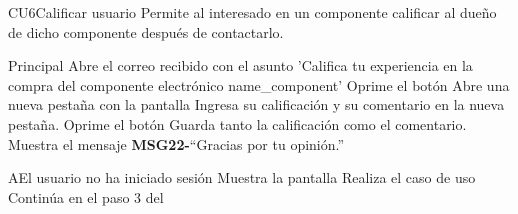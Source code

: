 
	\begin{UseCase}{CU6}{Calificar usuario}{
		Permite al interesado en un componente calificar al dueño de dicho componente después de contactarlo.
	}
	\end{UseCase}

	\begin{UCtrayectoria}{Principal}
		\UCpaso[\UCactor] Abre el correo recibido con el asunto 'Califica tu experiencia en la compra del componente electrónico name\_component'
		\UCpaso[\UCactor] Oprime el botón  
		\UCpaso Abre una nueva pestaña con la pantalla  
		\UCpaso[\UCactor] Ingresa su calificación y su comentario en la nueva pestaña.
		\UCpaso[\UCactor] Oprime el botón  
		\UCpaso Guarda tanto la calificación como el comentario.
		\UCpaso Muestra el mensaje {\bf MSG22-}``Gracias por tu opinión.''
	\end{UCtrayectoria}
		
		\begin{UCtrayectoriaA}{A}{El usuario no ha iniciado sesión}
			\UCpaso Muestra la pantalla 
			\UCpaso[\UCactor] Realiza el caso de uso 
			\UCpaso[\UCactor] Continúa en el paso 3 del 
		\end{UCtrayectoriaA}
		
